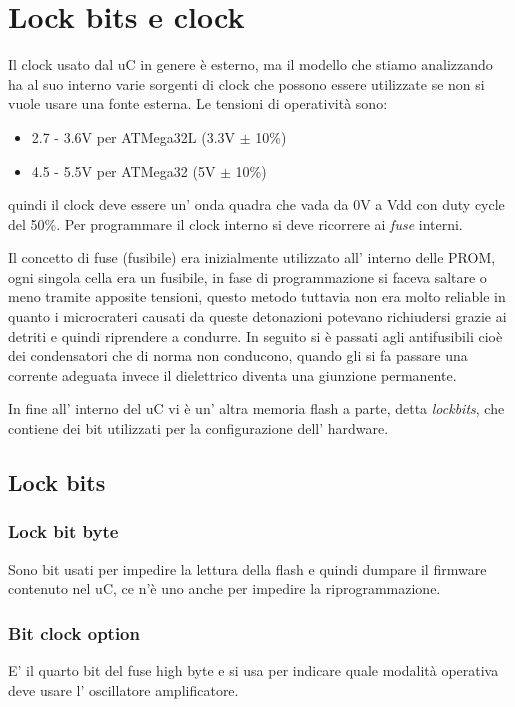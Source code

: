 \section{Lock bits e clock}
Il clock usato dal uC in genere è esterno, ma il modello che stiamo analizzando ha al suo interno varie sorgenti di clock che possono essere utilizzate se non si vuole usare una fonte esterna.
Le tensioni di operatività sono:
\begin{itemize}
    \item 2.7 - 3.6V per ATMega32L (3.3V $\pm$ 10\%)
    \item 4.5 - 5.5V per ATMega32 (5V $\pm$ 10\%)
\end{itemize}
quindi il clock deve essere un' onda quadra che vada da 0V a Vdd con duty cycle del 50\%.
Per programmare il clock interno si deve ricorrere ai \emph{fuse} interni.

Il concetto di fuse (fusibile) era inizialmente utilizzato all' interno delle PROM, ogni singola cella era un fusibile, in fase di programmazione si faceva saltare o meno tramite apposite tensioni, questo metodo tuttavia non era molto reliable in quanto i microcrateri causati da queste detonazioni potevano richiudersi grazie ai detriti e quindi riprendere a condurre.
In seguito si è passati agli antifusibili cioè dei condensatori che di norma non conducono, quando gli si fa passare una corrente adeguata invece il dielettrico diventa una giunzione permanente.

In fine all' interno del uC vi è un' altra memoria flash a parte, detta \emph{lockbits}, che contiene dei bit utilizzati per la configurazione dell' hardware.

\subsection{Lock bits}

\subsubsection{Lock bit byte}
Sono bit usati per impedire la lettura della flash e quindi dumpare il firmware contenuto nel uC, ce n'è uno anche per impedire la riprogrammazione.

\subsubsection{Bit clock option}
E' il quarto bit del fuse high byte e si usa per indicare quale modalità operativa deve usare l' oscillatore amplificatore.

